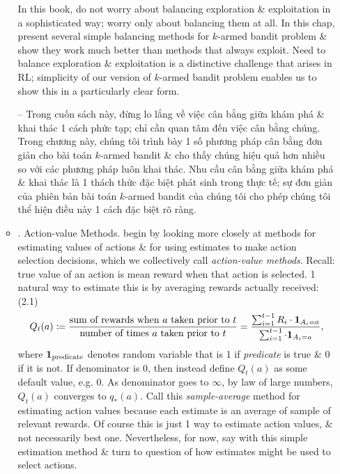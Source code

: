 \documentclass{article}
\begin{document}
\begin{itemize}
\begin{itemize}
        In this book, do not worry about balancing exploration \& exploitation in a sophisticated way; worry only about balancing them at all. In this chap, present several simple balancing methods for $k$-armed bandit problem \& show they work much better than methods that always exploit. Need to balance exploration \& exploitation is a distinctive challenge that arises in RL; simplicity of our version of $k$-armed bandit problem enables us to show this in a particularly clear form.

        -- Trong cuốn sách này, đừng lo lắng về việc cân bằng giữa khám phá \& khai thác 1 cách phức tạp; chỉ cần quan tâm đến việc cân bằng chúng. Trong chương này, chúng tôi trình bày 1 số phương pháp cân bằng đơn giản cho bài toán $k$-armed bandit \& cho thấy chúng hiệu quả hơn nhiều so với các phương pháp luôn khai thác. Nhu cầu cân bằng giữa khám phá \& khai thác là 1 thách thức đặc biệt phát sinh trong thực tế; sự đơn giản của phiên bản bài toán $k$-armed bandit của chúng tôi cho phép chúng tôi thể hiện điều này 1 cách đặc biệt rõ ràng.
        \item {. Action-value Methods.} begin by looking more closely at methods for estimating values of actions \& for using estimates to make action selection decisions, which we collectively call {\it action-value methods}. Recall: true value of an action is mean reward when that action is selected. 1 natural way to estimate this is by averaging rewards actually received: (2.1)
        \begin{equation*}
            Q_t(a)\coloneqq\frac{\mbox{sum of rewards when } a \mbox{ taken prior to } t}{\mbox{number of times } a \mbox{ taken prior to } t} = \frac{\sum_{i=1}^{t-1} R_i\cdot{\bf1}_{A_i = a}}{\sum_{i=1}^{t-1} \cdot{\bf1}_{A_i = a}},
        \end{equation*}
        where ${\bf1}_{\rm predicate}$ denotes random variable that is 1 if {\it predicate} is true \& 0 if it is not. If denominator is 0, then instead define $Q_t(a)$ as some default value, e.g. 0. As denominator goes to $\infty$, by law of large numbers, $Q_t(a)$ converges to $q_*(a)$. Call this {\it sample-average} method for estimating action values because each estimate is an average of sample of relevant rewards. Of course this is just 1 way to estimate action values, \& not necessarily best one. Nevertheless, for now, say with this simple estimation method \& turn to question of how estimates might be used to select actions.


\end{itemize}
\end{itemize}
\end{document}
